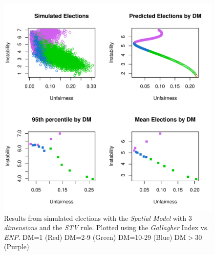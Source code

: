 \documentclass{article}
\begin{document}
\begin{figure}[]
\includegraphics[scale=1.00]{images/stv_spatial3_gallagher_enp.pdf}
\caption{Results from simulated elections with the \emph{Spatial Model} with \emph{$3$ dimensions} and the \emph{STV} rule. Plotted using the \emph{Gallagher} Index vs. \emph{ENP}. DM=1 (Red) DM=2-9 (Green) DM=10-29 (Blue) DM$>$30 (Purple)}
\label{fig:stv_spatial3}
\end{figure}
\end{document}
